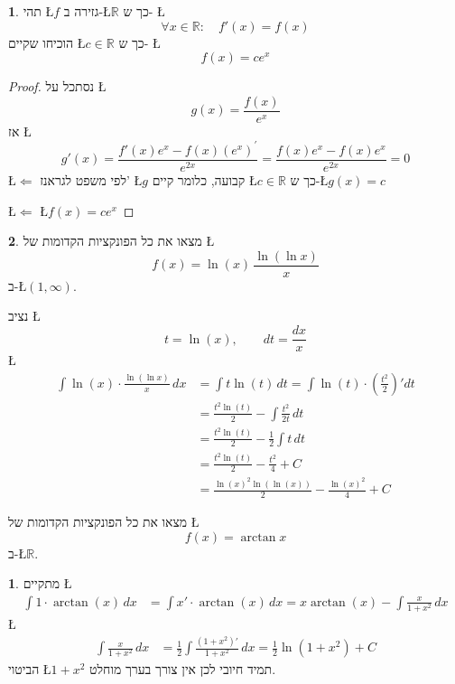 \documentclass[english,hebrew]{article}
\theoremstyle{definition}
\newtheorem*{problem*}{\protect\problemname}
\theoremstyle{definition}
\newtheorem*{sol*}{\protect\solutionname}
\providecommand{\problemname}{בעיה}
\providecommand{\solutionname}{פתרון}
\begin{document}
\begin{problem*}
תהי \L{$f$} גזירה ב-\L{$\mathbb{R}$} כך ש- \L{%
\[
\forall x\in\mathbb{R}:\quad f'(x)=f(x)
\]
}%
הוכיחו שקיים \L{$c\in\mathbb{R}$} כך ש- \L{%
\[
f(x)=ce^{x}
\]
}%
\end{problem*}
\begin{proof}
נסתכל על \L{%
\[
g(x)=\frac{f(x)}{e^{x}}
\]
}%
אז \L{%
\[
g'(x)=\frac{f'(x)e^{x}-f(x)\left(e^{x}\right)^{'}}{e^{2x}}=\frac{f(x)e^{x}-f(x)e^{x}}{e^{2x}}=0
\]
}%
\L{$\Leftarrow$} לפי משפט לגראנז' \L{$g$} קבועה, כלומר קיים \L{$c\in\mathbb{R}$}
כך ש-\L{$g(x)=c$}

\L{$\Leftarrow$} \L{$f(x)=ce^{x}$}
\end{proof}
\begin{problem*}
מצאו את כל הפונקציות הקדומות של \L{%
\[
f(x)=\ln(x)\,\frac{\ln(\ln x)}{x}
\]
}%
ב-\L{$(1,\infty)$}.

נציב \L{%
\[
t=\ln(x),\qquad dt=\frac{dx}{x}
\]
}%
\L{%
\begin{align*}
\int\ln(x)\cdot\frac{\ln(\ln x)}{x}\,dx & =\int t\ln(t)\,dt=\int\ln(t)\cdot\left(\frac{t^{2}}{2}\right)'dt\\
 & =\frac{t^{2}\ln(t)}{2}-\int\frac{t^{2}}{2t}\,dt\\
 & =\frac{t^{2}\ln(t)}{2}-\frac{1}{2}\int t\,dt\\
 & =\frac{t^{2}\ln(t)}{2}-\frac{t^{2}}{4}+C\\
 & =\frac{\ln(x)^{2}\ln(\ln(x))}{2}-\frac{\ln(x)^{2}}{4}+C
\end{align*}
}%

מצאו את כל הפונקציות הקדומות של \L{%
\[
f(x)=\arctan x
\]
}%
ב-\L{$\mathbb{R}$}.
\end{problem*}
\begin{sol*}
מתקיים \L{%
\begin{align*}
\int1\cdot\arctan(x)\,dx & =\int x'\cdot\arctan(x)\,dx=x\arctan(x)-\int\frac{x}{1+x^{2}}\,dx
\end{align*}
}%
\L{%
\begin{align*}
\int\frac{x}{1+x^{2}}\,dx & =\frac{1}{2}\int\frac{\left(1+x^{2}\right)'}{1+x^{2}}\,dx=\frac{1}{2}\ln\left(1+x^{2}\right)+C
\end{align*}
}%
הביטוי \L{$1+x^{2}$} תמיד חיובי לכן אין צורך בערך מוחלט.
\end{sol*}
\end{document}
